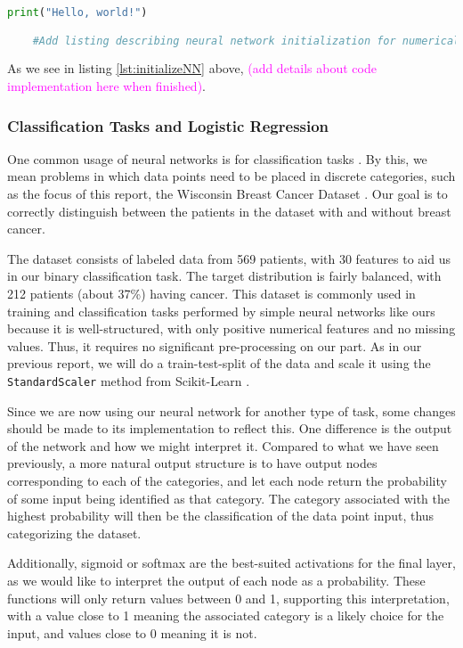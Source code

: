 \begin{lstlisting}[language=Python, label={lst:initializeNN}, caption=Initialization of a neural network used for a numerical prediction of linear regression coefficients.]
    print("Hello, world!")

    #Add listing describing neural network initialization for numerical prediction of linear regression coefficients.
\end{lstlisting}
As we see in listing \ref{lst:initializeNN} above, \textcolor{magenta}{(add details about code implementation here when finished)}.

\subsubsection{Classification Tasks and Logistic Regression}
One common usage of neural networks is for classification tasks \cite{metanaClassificationTasks}. By this, we mean problems in which data points need to be placed in discrete categories, such as the focus of this report, the Wisconsin Breast Cancer Dataset \cite{sklearnBreastCancerData}. Our goal is to correctly distinguish between the patients in the dataset with and without breast cancer.  

The dataset consists of labeled data from 569 patients, with 30 features to aid us in our binary classification task. The target distribution is fairly balanced, with 212 patients (about 37\%) having cancer. This dataset is commonly used in training and classification tasks performed by simple neural networks like ours because it is well-structured, with only positive numerical features and no missing values. Thus, it requires no significant pre-processing on our part. As in our previous report, we will do a train-test-split of the data and scale it using the \texttt{StandardScaler} method from Scikit-Learn \cite{sklearnScaling}.

Since we are now using our neural network for another type of task, some changes should be made to its implementation to reflect this. One difference is the output of the network and how we might interpret it. Compared to what we have seen previously, a more natural output structure is to have output nodes corresponding to each of the categories, and let each node return the probability of some input being identified as that category. The category associated with the highest probability will then be the classification of the data point input, thus categorizing the dataset. 

Additionally, sigmoid or softmax are the best-suited activations for the final layer, as we would like to interpret the output of each node as a probability. These functions will only return values between 0 and 1, supporting this interpretation, with a value close to 1 meaning the associated category is a likely choice for the input, and values close to 0 meaning it is not. 

